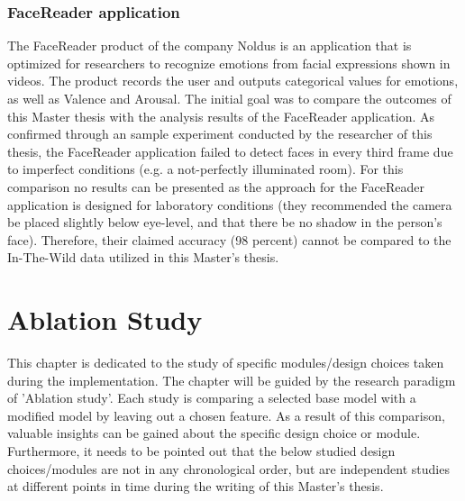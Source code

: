 \subsubsection{FaceReader application}
The FaceReader product of the company Noldus \citep{Noldus:2020:Facereader} is an application that is optimized for researchers to recognize emotions from facial expressions shown in videos. The product records the user and outputs categorical values for emotions, as well as Valence and Arousal. The initial goal was to compare the outcomes of this Master thesis with the analysis results of the FaceReader application.
\newline\newline
As confirmed through an sample experiment conducted by the researcher of this thesis, the FaceReader application failed to detect faces in every third frame due to imperfect conditions (e.g. a not-perfectly illuminated room). For this comparison no results can be presented as the approach for the FaceReader application is designed for laboratory conditions (they recommended the camera be placed slightly below eye-level, and that there be no shadow in the person's face). Therefore, their claimed accuracy (98 percent) cannot be compared to the In-The-Wild data utilized in this Master's thesis.


\section{Ablation Study}
This chapter is dedicated to the study of specific modules/design choices taken during the implementation. The chapter will be guided by the research paradigm of 'Ablation study'. Each study is comparing a selected base model with a modified model by leaving out a chosen feature. As a result of this comparison, valuable insights can be gained about the specific design choice or module. Furthermore, it needs to be pointed out that the below studied design choices/modules are not in any chronological order, but are independent studies at different points
in time during the writing of this Master’s thesis.

